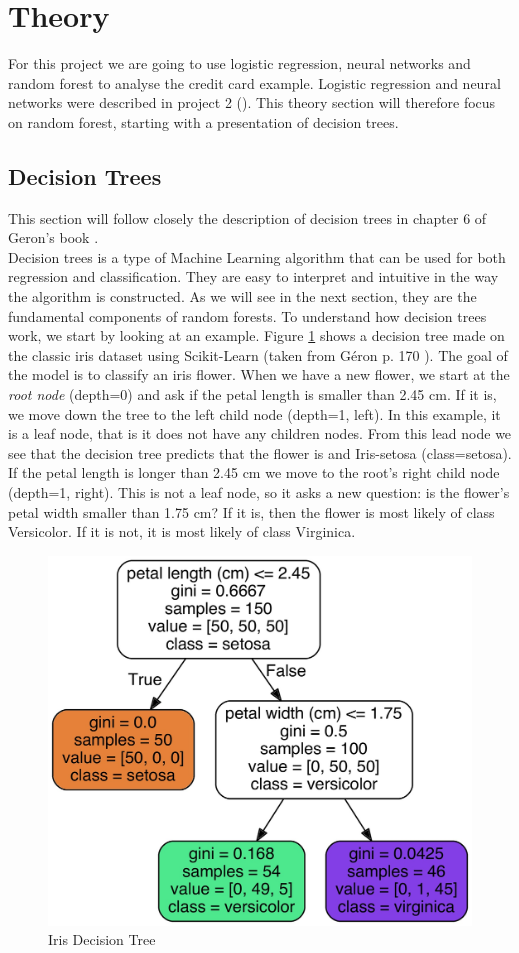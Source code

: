\documentclass[12pt]{article}
\numberwithin{figure}{section}
\begin{document}
\section{Theory}
For this project we are going to use logistic regression, neural networks and random forest to analyse the credit card example. Logistic regression and neural networks were described in project 2 (\cite{project2}). This theory section will therefore focus on random forest, starting with a presentation of decision trees.
\subsection{Decision Trees}
This section will follow closely the description of decision trees in chapter 6 of Geron's book \cite{Geron}.\\
Decision trees is a type of Machine Learning algorithm that can be used for both regression and classification. They are easy to interpret and intuitive in the way the algorithm is constructed. As we will see in the next section, they are the fundamental components of random forests. To understand how decision trees work, we start by looking at an example. Figure \ref{figT:iris_tree} shows a decision tree made on the classic iris dataset using Scikit-Learn (taken from Géron p. 170 \cite{Geron}). The goal of the model is to classify an iris flower. When we have a new flower, we start at the \textit{root node} (depth=0) and ask if the petal length is smaller than 2.45 cm. If it is, we move down the tree to the left child node (depth=1, left). In this example, it is a leaf node, that is it does not have any children nodes. From this lead node we see that the decision tree predicts that the flower is and Iris-setosa (class=setosa). If the petal length is longer than 2.45 cm we move to the root's right child node (depth=1, right). This is not a leaf node, so it asks a new question: is the flower's petal width smaller than 1.75 cm? If it is, then the flower is most likely of class Versicolor. If it is not, it is most likely of class Virginica.\\ 
\begin{figure}[H]
\centering
\includegraphics[width=0.8\linewidth]{decision-tree-iris.jpg}
\caption{Iris Decision Tree}
\label{figT:iris_tree}
\end{figure}
\end{document}
